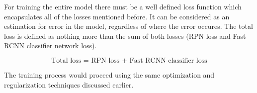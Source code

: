 For training the entire model there must be a well defined loss function which encapsulates all of the losses mentioned before. It can be considered as an estimation for error in the model, regardless of where the error occures. The total loss is defined as nothing more than the sum of both losses (RPN loss and Fast RCNN classifier network loss).

\begin{equation}
  \text{Total loss = RPN loss + Fast RCNN classifier loss}
\end{equation}

The training process would proceed using the same optimization and regularization techniques discussed earlier.

%

